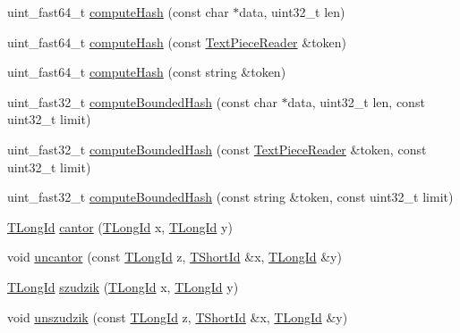 \begin{DoxyCompactItemize}
\item 
uint\+\_\+fast64\+\_\+t \hyperlink{namespaceuva_1_1smt_1_1hashing_aa372dbea8bcfd35b1278598df650a56f}{compute\+Hash} (const char $\ast$data, uint32\+\_\+t len)
\item 
uint\+\_\+fast64\+\_\+t \hyperlink{namespaceuva_1_1smt_1_1hashing_a3dec5678734cb96a27ecf4df41c6f3ce}{compute\+Hash} (const \hyperlink{classuva_1_1smt_1_1file_1_1_text_piece_reader}{Text\+Piece\+Reader} \&token)
\item 
uint\+\_\+fast64\+\_\+t \hyperlink{namespaceuva_1_1smt_1_1hashing_a5d52e69625f3cde0c9d05c17994c4943}{compute\+Hash} (const string \&token)
\item 
uint\+\_\+fast32\+\_\+t \hyperlink{namespaceuva_1_1smt_1_1hashing_a0185c620c3b3707f559c423f366a7f19}{compute\+Bounded\+Hash} (const char $\ast$data, uint32\+\_\+t len, const uint32\+\_\+t limit)
\item 
uint\+\_\+fast32\+\_\+t \hyperlink{namespaceuva_1_1smt_1_1hashing_a387f024518c6907d3a1fca92443bf53d}{compute\+Bounded\+Hash} (const \hyperlink{classuva_1_1smt_1_1file_1_1_text_piece_reader}{Text\+Piece\+Reader} \&token, const uint32\+\_\+t limit)
\item 
uint\+\_\+fast32\+\_\+t \hyperlink{namespaceuva_1_1smt_1_1hashing_a767a9f7163a83984fbc240edaf75b61a}{compute\+Bounded\+Hash} (const string \&token, const uint32\+\_\+t limit)
\item 
\hyperlink{namespaceuva_1_1smt_1_1hashing_a5992ac0dea0fb3226fb403ede09fad55}{T\+Long\+Id} \hyperlink{namespaceuva_1_1smt_1_1hashing_ab870d4db140cd2f763a334f82db0d904}{cantor} (\hyperlink{namespaceuva_1_1smt_1_1hashing_a5992ac0dea0fb3226fb403ede09fad55}{T\+Long\+Id} x, \hyperlink{namespaceuva_1_1smt_1_1hashing_a5992ac0dea0fb3226fb403ede09fad55}{T\+Long\+Id} y)
\item 
void \hyperlink{namespaceuva_1_1smt_1_1hashing_a5c885761adf4c13f267b1d0c1f205daa}{uncantor} (const \hyperlink{namespaceuva_1_1smt_1_1hashing_a5992ac0dea0fb3226fb403ede09fad55}{T\+Long\+Id} z, \hyperlink{namespaceuva_1_1smt_1_1hashing_adcf22e1982ad09d3a63494c006267469}{T\+Short\+Id} \&x, \hyperlink{namespaceuva_1_1smt_1_1hashing_a5992ac0dea0fb3226fb403ede09fad55}{T\+Long\+Id} \&y)
\item 
\hyperlink{namespaceuva_1_1smt_1_1hashing_a5992ac0dea0fb3226fb403ede09fad55}{T\+Long\+Id} \hyperlink{namespaceuva_1_1smt_1_1hashing_aa902304943fda935979f1b3bd0bea64d}{szudzik} (\hyperlink{namespaceuva_1_1smt_1_1hashing_a5992ac0dea0fb3226fb403ede09fad55}{T\+Long\+Id} x, \hyperlink{namespaceuva_1_1smt_1_1hashing_a5992ac0dea0fb3226fb403ede09fad55}{T\+Long\+Id} y)
\item 
void \hyperlink{namespaceuva_1_1smt_1_1hashing_ab81d1f9d50a921d629e445eff89988b3}{unszudzik} (const \hyperlink{namespaceuva_1_1smt_1_1hashing_a5992ac0dea0fb3226fb403ede09fad55}{T\+Long\+Id} z, \hyperlink{namespaceuva_1_1smt_1_1hashing_adcf22e1982ad09d3a63494c006267469}{T\+Short\+Id} \&x, \hyperlink{namespaceuva_1_1smt_1_1hashing_a5992ac0dea0fb3226fb403ede09fad55}{T\+Long\+Id} \&y)
\end{DoxyCompactItemize}
